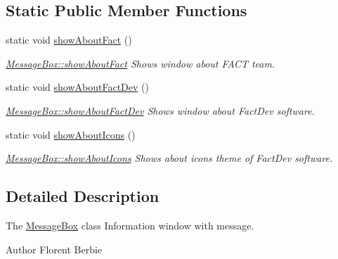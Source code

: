 \subsection*{Static Public Member Functions}
\begin{DoxyCompactItemize}
\item 
\hypertarget{classMessageBox_a8bd06bf00849e20b2a1f4cf0741eee6c}{static void \hyperlink{classMessageBox_a8bd06bf00849e20b2a1f4cf0741eee6c}{show\+About\+Fact} ()}\label{classMessageBox_a8bd06bf00849e20b2a1f4cf0741eee6c}

\begin{DoxyCompactList}\small\item\em \hyperlink{classMessageBox_a8bd06bf00849e20b2a1f4cf0741eee6c}{Message\+Box\+::show\+About\+Fact} Shows window about F\+A\+C\+T team. \end{DoxyCompactList}\item 
\hypertarget{classMessageBox_aea5966113f5e40d53b450691ce41071c}{static void \hyperlink{classMessageBox_aea5966113f5e40d53b450691ce41071c}{show\+About\+Fact\+Dev} ()}\label{classMessageBox_aea5966113f5e40d53b450691ce41071c}

\begin{DoxyCompactList}\small\item\em \hyperlink{classMessageBox_aea5966113f5e40d53b450691ce41071c}{Message\+Box\+::show\+About\+Fact\+Dev} Shows window about Fact\+Dev software. \end{DoxyCompactList}\item 
\hypertarget{classMessageBox_ac9212e2d9aaba9df3dfceb768486fc21}{static void \hyperlink{classMessageBox_ac9212e2d9aaba9df3dfceb768486fc21}{show\+About\+Icons} ()}\label{classMessageBox_ac9212e2d9aaba9df3dfceb768486fc21}

\begin{DoxyCompactList}\small\item\em \hyperlink{classMessageBox_ac9212e2d9aaba9df3dfceb768486fc21}{Message\+Box\+::show\+About\+Icons} Shows about icons theme of Fact\+Dev software. \end{DoxyCompactList}\end{DoxyCompactItemize}


\subsection{Detailed Description}
The \hyperlink{classMessageBox}{Message\+Box} class Information window with message. 

\begin{DoxyAuthor}{Author}
Florent Berbie 
\end{DoxyAuthor}


